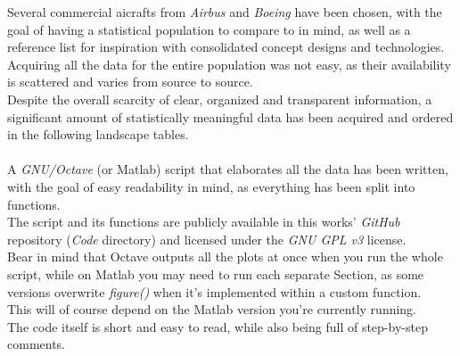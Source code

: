 \documentclass{article}
\begin{document}
Several commercial aicrafts from \textit{Airbus} and \textit{Boeing} have been chosen, with
the goal of having a statistical population to compare to in mind, as well as a reference list for 
inspiration with consolidated concept designs and technologies.\\
Acquiring all the data for the entire population was not easy, as their availability is scattered and varies from source
to source.\\
Despite the overall scarcity of clear, organized and transparent information, a significant amount of statistically meaningful
data has been acquired and ordered in the following landscape tables.\\ \\ 
A \textit{GNU/Octave} \autocite{Octave} (or Matlab) script that elaborates all the data has been written, with the goal
of easy readability in mind, as everything has been split into functions. \\
The script and its functions are publicly available in this works' \textit{GitHub} repository \autocite{Airbus_replacement_repo} (\textit{Code} directory) and 
licensed under the \textit{GNU GPL v3} license.\\ 
Bear in mind that Octave outputs all the plots at once when you run the whole script, while on Matlab
you may need to run each separate Section, as some versions overwrite \textit{figure()} when it's implemented
within a custom function.\\ 
This will of course depend on the Matlab version you're currently running.\\ The code itself is short and easy to read,
while also being full of step-by-step comments.


\newpage
\end{document}
